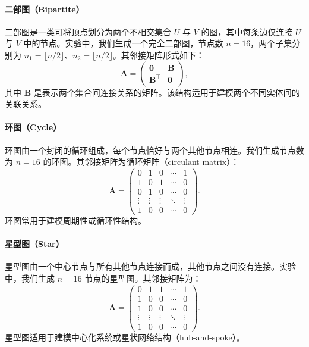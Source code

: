 \paragraph*{二部图（Bipartite）}
二部图是一类可将顶点划分为两个不相交集合 \(U\) 与 \(V\) 的图，其中每条边仅连接 \(U\) 与 \(V\) 中的节点。实验中，我们生成一个完全二部图，节点数 \(n = 16\)，两个子集分别为 \(n_1 = \lfloor n/2 \rfloor\)、\(n_2 = \lfloor n/2 \rfloor\)。其邻接矩阵形式如下：
\[
\mathbf{A} = \begin{pmatrix}
\mathbf{0} & \mathbf{B} \\
\mathbf{B}^\top & \mathbf{0}
\end{pmatrix},
\]
其中 \(\mathbf{B}\) 是表示两个集合间连接关系的矩阵。该结构适用于建模两个不同实体间的关联关系。

\paragraph*{环图（Cycle）}
环图由一个封闭的循环组成，每个节点恰好与两个其他节点相连。我们生成节点数为 \(n = 16\) 的环图。其邻接矩阵为循环矩阵（circulant matrix）：
\[
\mathbf{A} = \begin{pmatrix}
0 & 1 & 0 & \cdots & 1 \\
1 & 0 & 1 & \cdots & 0 \\
0 & 1 & 0 & \cdots & 0 \\
\vdots & \vdots & \vdots & \ddots & \vdots \\
1 & 0 & 0 & \cdots & 0
\end{pmatrix}.
\]
环图常用于建模周期性或循环性结构。

\paragraph*{星型图（Star）}
星型图由一个中心节点与所有其他节点连接而成，其他节点之间没有连接。实验中，我们生成 \(n = 16\) 节点的星型图。其邻接矩阵为：
\[
\mathbf{A} = \begin{pmatrix}
0 & 1 & 1 & \cdots & 1 \\
1 & 0 & 0 & \cdots & 0 \\
1 & 0 & 0 & \cdots & 0 \\
\vdots & \vdots & \vdots & \ddots & \vdots \\
1 & 0 & 0 & \cdots & 0
\end{pmatrix}.
\]
星型图适用于建模中心化系统或星状网络结构（hub-and-spoke）。

